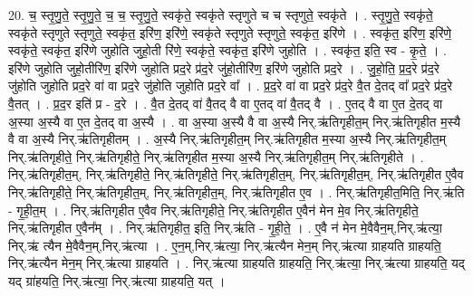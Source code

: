 \documentclass[17pt]{extarticle}
\begin{document}
20. च॒ स्तृ॒णु॒ते॒ स्तृ॒णु॒ते॒ च॒ च॒ स्तृ॒णु॒ते॒ स्वकृ॑ते॒ स्वकृ॑ते स्तृणुते च च स्तृणुते॒ स्वकृ॑ते । . स्तृ॒णु॒ते॒ स्वकृ॑ते॒ स्वकृ॑ते स्तृणुते स्तृणुते॒ स्वकृ॑त॒ इरि॑ण॒ इरि॑णे॒ स्वकृ॑ते स्तृणुते स्तृणुते॒ स्वकृ॑त॒ इरि॑णे । . स्वकृ॑त॒ इरि॑ण॒ इरि॑णे॒ स्वकृ॑ते॒ स्वकृ॑त॒ इरि॑णे जुहोति जुहो॒ती रि॑णे॒ स्वकृ॑ते॒ स्वकृ॑त॒ इरि॑णे जुहोति । . स्वकृ॑त॒ इति॒ स्व - कृ॒ते॒ । . इरि॑णे जुहोति जुहो॒तीरि॑ण॒ इरि॑णे जुहोति प्रद॒रे प्र॑द॒रे जु॑हो॒तीरि॑ण॒ इरि॑णे जुहोति प्रद॒रे । . जु॒हो॒ति॒ प्र॒द॒रे प्र॑द॒रे जु॑होति जुहोति प्रद॒रे वा॑ वा प्रद॒रे जु॑होति जुहोति प्रद॒रे वा᳚ । . प्र॒द॒रे वा॑ वा प्रद॒रे प्र॑द॒रे वै॒त दे॒तद् वा᳚ प्रद॒रे प्र॑द॒रे वै॒तत् । . प्र॒द॒र इति॑ प्र - द॒रे । . वै॒त दे॒तद् वा॑ वै॒तद् वै वा ए॒तद् वा॑ वै॒तद् वै । . ए॒तद् वै वा ए॒त दे॒तद् वा अ॒स्या अ॒स्यै वा ए॒त दे॒तद् वा अ॒स्यै । . वा अ॒स्या अ॒स्यै वै वा अ॒स्यै निर्.ऋ॑तिगृहीत॒म् निर्.ऋ॑तिगृहीत म॒स्यै वै वा अ॒स्यै निर्.ऋ॑तिगृहीतम् । . अ॒स्यै निर्.ऋ॑तिगृहीत॒म् निर्.ऋ॑तिगृहीत म॒स्या अ॒स्यै निर्.ऋ॑तिगृहीत॒म् निर्.ऋ॑तिगृहीते॒ निर्.ऋ॑तिगृहीते॒ निर्.ऋ॑तिगृहीत म॒स्या अ॒स्यै निर्.ऋ॑तिगृहीत॒म् निर्.ऋ॑तिगृहीते । . निर्.ऋ॑तिगृहीत॒म्, निर्.ऋ॑तिगृहीते॒ निर्.ऋ॑तिगृहीते॒ निर्.ऋ॑तिगृहीत॒म्, निर्.ऋ॑तिगृहीत॒म्, निर्.ऋ॑तिगृहीत ए॒वैव निर्.ऋ॑तिगृहीते॒ निर्.ऋ॑तिगृहीत॒म्, निर्.ऋ॑तिगृहीत॒म्, निर्.ऋ॑तिगृहीत ए॒व । . निर्.ऋ॑तिगृहीत॒मिति॒ निर्.ऋ॑ति - गृ॒ही॒त॒म् । . निर्.ऋ॑तिगृहीत ए॒वैव निर्.ऋ॑तिगृहीते॒ निर्.ऋ॑तिगृहीत ए॒वैन॑ मेन मे॒व निर्.ऋ॑तिगृहीते॒ निर्.ऋ॑तिगृहीत ए॒वैन᳚म् । . निर्.ऋ॑तिगृहीत॒ इति॒ निर्.ऋ॑ति - गृ॒ही॒ते॒ । . ए॒वै न॑ मेन मे॒वैवैन॒म्,निर्.ऋ॑त्या॒ निर्.ऋ॑ त्यैन मे॒वैवैन॒म्,निर्.ऋ॑त्या । . ए॒न॒म्,निर्.ऋ॑त्या॒ निर्.ऋ॑त्यैन मेन॒म् निर्.ऋ॑त्या ग्राहयति ग्राहयति॒ निर्.ऋ॑त्यैन मेन॒म् निर्.ऋ॑त्या ग्राहयति । . निर्.ऋ॑त्या ग्राहयति ग्राहयति॒ निर्.ऋ॑त्या॒ निर्.ऋ॑त्या ग्राहयति॒ यद् यद् ग्रा॑हयति॒ निर्.ऋ॑त्या॒ निर्.ऋ॑त्या ग्राहयति॒ यत् । \newline
\end{document}
